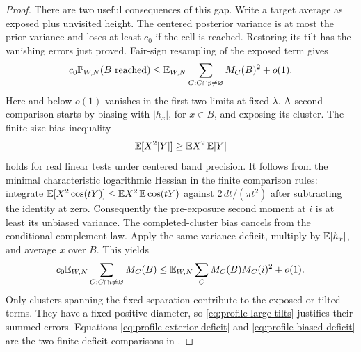 \begin{proof}
There are two useful consequences of this gap.  Write a target
average as exposed plus unvisited height.  The centered posterior
variance is at most the prior variance and loses at least \(c_0\)
if the cell is reached.  Restoring its tilt has the vanishing
errors just proved.  Fair-sign resampling of the exposed term gives
\begin{equation}\label{eq:profile-exterior-deficit}
 c_0\mathbb P_{W,N}(B\text{ reached})
    \le\mathbb E_{W,N}\sum_{C:C\cap p\ne\varnothing}M_C(B)^2+o(1).
\end{equation}
Here and below \(o(1)\) vanishes in the first two limits at fixed
\(\lambda\).  A second comparison starts by biasing with \(|h_x|\),
for \(x\in B\), and exposing its cluster.  The finite size-bias
inequality
\[
                   \mathbb E[X^2|Y|]\ge\mathbb E X^2\,\mathbb E|Y|
\]
holds for real linear tests under centered band precision.  It follows
from the minimal characteristic logarithmic Hessian in the finite
comparison rules: integrate
\(\mathbb E[X^2\cos(tY)]\le\mathbb E X^2\,\mathbb E\cos(tY)\) against
\(2\,dt/(\pi t^2)\) after subtracting the identity at zero.
Consequently the pre-exposure second moment at \(i\) is at least
its unbiased variance.  The completed-cluster bias cancels from
the conditional complement law.  Apply the same variance deficit,
multiply by \(\mathbb E|h_x|\), and average \(x\) over \(B\).  This yields
\begin{equation}\label{eq:profile-biased-deficit}
 c_0\mathbb E_{W,N}\sum_{C:C\cap i\ne\varnothing}M_C(B)
       \le\mathbb E_{W,N}\sum_C M_C(B)M_C(i)^2+o(1).
\end{equation}
Only clusters spanning the fixed separation contribute to the
exposed or tilted terms.  They have a fixed positive diameter,
so \eqref{eq:profile-large-tilts} justifies their summed errors.
Equations \eqref{eq:profile-exterior-deficit} and
\eqref{eq:profile-biased-deficit} are the two finite deficit
comparisons in \cite[Equations~(3.16)--(3.17),
proof of Proposition~3.8]{X}.


\end{proof}
